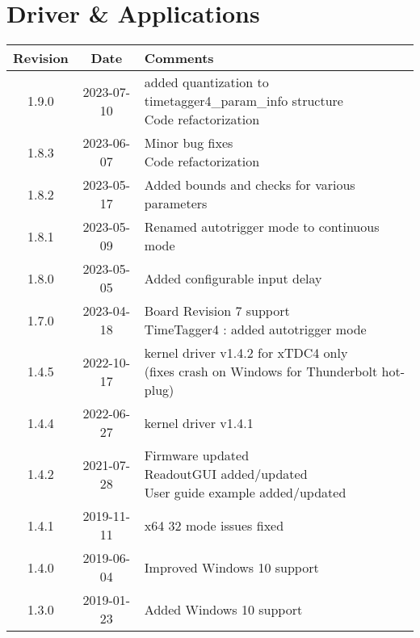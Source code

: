 \section{Driver \& Applications}
\begin{tabularx}{\textwidth}{|c|c|X|}
    \hline
    Revision & Date & Comments\\
    \hline\hline
    \hline
    \hypertarget{drvrev}{1.9.0} & 2023-07-10 &
    \makecell[l] {
       added quantization to timetagger4\_param\_info structure \\*
       Code refactorization\\*   
    }\\   
    \hline
    {1.8.3} & 2023-06-07 &
    \makecell[l] {
        Minor bug fixes\\*
        Code refactorization\\*        
    }\\
    \hline
    {1.8.2} & 2023-05-17 &
    \makecell[l] {
        Added bounds and checks for various parameters\\*         
    }\\
    \hline
    {1.8.1} & 2023-05-09 &
    \makecell[l] {
     Renamed autotrigger mode to continuous mode  \\*  
    }\\
    \hline
    {1.8.0} & 2023-05-05 &
    \makecell[l] {
        Added configurable input delay\\*
    }\\
    \hline
    {1.7.0} & 2023-04-18 &
    \makecell[l] {
        Board Revision 7 support\\* 
        TimeTagger4 : added autotrigger mode\\*
    }\\
    \hline
    {1.4.5} & 2022-10-17 &
    \makecell[l] {
        kernel driver v1.4.2 for xTDC4 only\\* 
        (fixes crash on Windows for Thunderbolt hot-plug)\\*
    }\\
    \hline
    {1.4.4} & 2022-06-27 &
        kernel driver v1.4.1\\
    \hline
    1.4.2 & 2021-07-28 &
    \makecell[l]{
        Firmware updated \\*
        ReadoutGUI added/updated \\*
        User guide example added/updated \\*
    }\\
    \hline
    {1.4.1} & 2019-11-11 & x64 32 mode issues fixed\\
    \hline
    {1.4.0} & 2019-06-04 & Improved Windows 10 support\\
    \hline
    {1.3.0} & 2019-01-23 & Added Windows 10 support\\
    \hline
\end{tabularx}